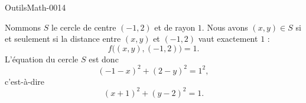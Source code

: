 
\begin{corrige}{OutilsMath-0014}

	Nommons $S$ le cercle de centre $(-1,2)$ et de rayon $1$. Nous avons $(x,y)\in S$ si et seulement si la distance entre $(x,y)$ et $(-1,2)$ vaut exactement $1$ :
	\begin{equation}
		f\big( (x,y),(-1,2) \big)=1.
	\end{equation}
	L'équation du cercle $S$ est donc
	\begin{equation}
		(-1-x)^2+(2-y)^2=1^2,
	\end{equation}
	c'est-à-dire
	\begin{equation}
		(x+1)^2+(y-2)^2=1.
	\end{equation}

\end{corrige}
